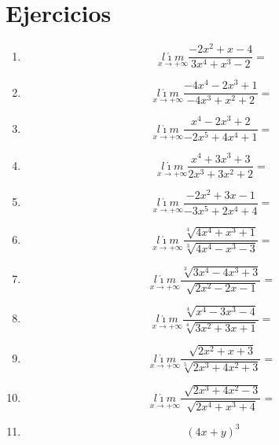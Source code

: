 \documentclass[oneside,spanish,letter]{article}
\begin{document}
\section{Ejercicios}
\begin{enumerate}
 \item $$\underset{x\rightarrow +\infty}{l\acute{\imath}m} \frac{-2x^2+x-4}{3x^4+x^3-2}=$$
 \item $$\underset{x\rightarrow +\infty}{l\acute{\imath}m} \frac{-4x^4-2x^3+1}{-4x^3+x^2+2}=$$
 \item $$\underset{x\rightarrow +\infty}{l\acute{\imath}m} \frac{x^4-2x^3+2}{-2x^5+4x^4+1}=$$
 \item $$\underset{x\rightarrow +\infty}{l\acute{\imath}m} \frac{x^4+3x^3+3}{2x^3+3x^2+2}=$$
 \item $$\underset{x\rightarrow +\infty}{l\acute{\imath}m} \frac{-2x^2+3x-1}{-3x^5+2x^4+4}=$$
 \item $$\underset{x\rightarrow +\infty}{l\acute{\imath}m} \frac{\sqrt[4]{4x^4+x^3+1}}{\sqrt[3]{4x^4-x^3-3}}=$$
 \item $$\underset{x\rightarrow +\infty}{l\acute{\imath}m} \frac{\sqrt[3]{3x^4-4x^3+3}}{\sqrt[]{2x^2-2x-1}}=$$
 \item $$\underset{x\rightarrow +\infty}{l\acute{\imath}m} \frac{\sqrt[4]{x^4-3x^3-4}}{\sqrt[4]{3x^2+3x+1}}=$$
 \item $$\underset{x\rightarrow +\infty}{l\acute{\imath}m} \frac{\sqrt[]{2x^2+x+3}}{\sqrt[5]{2x^3+4x^2+3}}=$$
 \item $$\underset{x\rightarrow +\infty}{l\acute{\imath}m} \frac{\sqrt[]{2x^3+4x^2-3}}{\sqrt[]{2x^4+x^3+4}}=$$
\item $$(4x+y)^3$$
 \end{enumerate}
  \newpage
\end{document}
